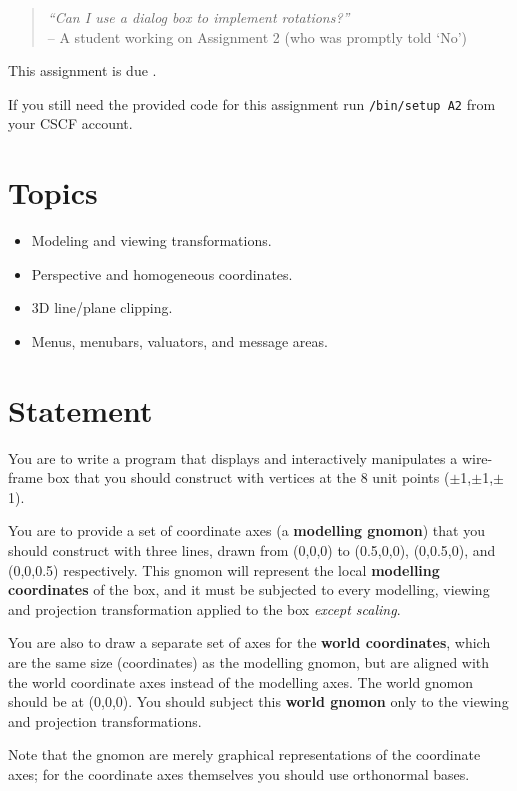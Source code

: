 \begin{quote}
        {\sl 
        ``Can I use a dialog box to implement rotations?'' 
        } \\
        \mbox{}\hfill -- A student working on Assignment 2 
                (who was promptly told `No')
\end{quote}
This assignment is due {\bf \AtwoDeadline}. 

If you still need the
provided code for this assignment run
 \texttt{\CourseData/bin/setup A2}
from your CSCF account.

\section{Topics}
\begin{itemize}
\item Modeling and viewing transformations.
\item Perspective and homogeneous coordinates.
\item 3D line/plane clipping.
\item Menus, menubars, valuators, and message areas.
\end{itemize}

\section{Statement}
You are to write a program that displays and interactively manipulates a
wire-frame box that you should construct with vertices at the 8 unit points
($\pm$1,$\pm$1,$\pm$1).  

You are to provide a
set of coordinate axes
(a {\bf modelling gnomon})
that you should construct with three lines, drawn from (0,0,0)
to (0.5,0,0), (0,0.5,0), and (0,0,0.5) respectively.
This gnomon will represent the local {\bf modelling coordinates} of the box, 
and it must be subjected to every modelling, viewing
and projection transformation applied to the box
{\em except scaling}.

You are also to draw a separate set of axes for the {\bf world coordinates},
which are the same size (coordinates) as the modelling gnomon, but are aligned
with the world coordinate axes instead of the modelling axes.
The world gnomon should be at (0,0,0).
You should subject this {\bf world gnomon}
only to the viewing and projection transformations.

Note that the gnomon are merely graphical representations of the coordinate
axes; for the coordinate axes themselves you should use orthonormal bases.

